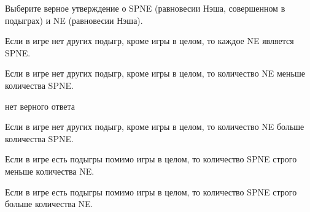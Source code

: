 
\begin{question}
Выберите верное утверждение о SPNE (равновесии Нэша, совершенном в
подыграх) и NE (равновесии Нэша).
\begin{answerlist}
  \item Если в игре нет других подыгр, кроме игры в целом, то каждое NE является
SPNE.
  \item Если в игре нет других подыгр, кроме игры в целом, то количество NE
меньше количества SPNE.
  \item нет верного ответа
  \item Если в игре нет других подыгр, кроме игры в целом, то количество NE
больше количества SPNE.
  \item Если в игре есть подыгры помимо игры в целом, то количество SPNE строго
меньше количества NE.
  \item Если в игре есть подыгры помимо игры в целом, то количество SPNE строго
больше количества NE.
\end{answerlist}
\end{question}


